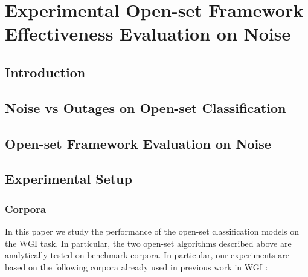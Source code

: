 
\chapter{Experimental Open-set Framework Effectiveness Evaluation on Noise}

\label{chap:noise}


\newcommand{\keyword}[1]{\textbf{#1}}
\newcommand{\tabhead}[1]{\textbf{#1}}
\newcommand{\code}[1]{\texttt{#1}}
\newcommand{\file}[1]{\texttt{\bfseries#1}}
\newcommand{\option}[1]{\texttt{\itshape#1}}


\section{Introduction}\label{chap:noise:sec:intro}

\section{Noise vs Outages on Open-set Classification}\label{chap:noise:sec:noise_vs_outages}

\section{Open-set Framework Evaluation on Noise}\label{chap:noise:sec:openset_evaluation}



\section{Experimental Setup}\label{sec:experimental_setup}
\subsection{Corpora}\label{sec:corpora}
In this paper we study the performance of the open-set classification models on the WGI task. In particular, the two open-set algorithms described above are analytically tested on benchmark corpora. In particular, our experiments are based on the following corpora already used in previous work in WGI \citep{meyer2004genre,santini2007automatic,kanaris2009learning}:

